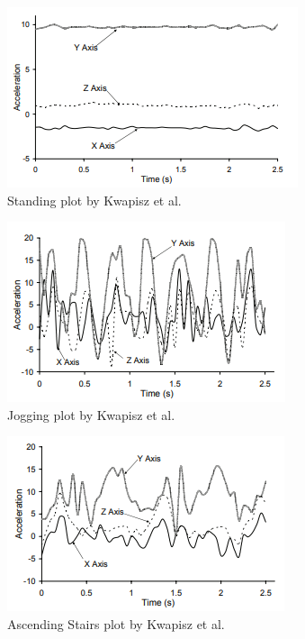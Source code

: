 \documentclass[conference]{IEEEtran}
\begin{document}
\begin{figure}[!p]
  \includegraphics[width=\linewidth]{standing.png}
  \caption{Standing plot by Kwapisz et al. ~\cite{Kwapisz2011}}
  \label{fig:standing}
\end{figure}
\begin{figure}[!p]
  \includegraphics[width=\linewidth]{jogging.png}
  \caption{Jogging plot by Kwapisz et al. ~\cite{Kwapisz2011}}
  \label{fig:jogging}
\end{figure}
\begin{figure}[!p]
  \includegraphics[width=\linewidth]{ascending_stairs.png}
  \caption{Ascending Stairs plot by Kwapisz et al. ~\cite{Kwapisz2011}}
  \label{fig:ascendingStairs}
\end{figure}
\end{document}
